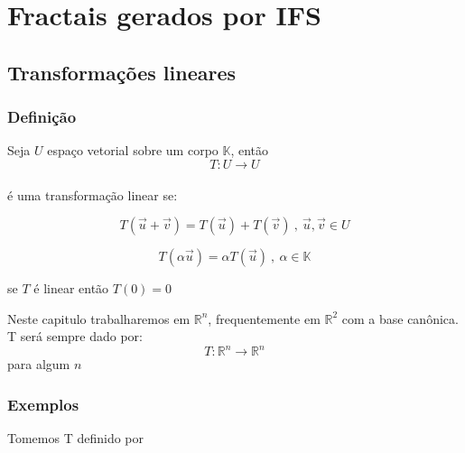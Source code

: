 \chapter{Fractais gerados por IFS}
\section{Transformações lineares}
\subsection{Definição}

Seja \(U\) espaço vetorial sobre um corpo \( \mathbb{K} \), então
\[T:U \longrightarrow U\]
\\
é uma transformação linear se:

\begin{equation}
    T(\Vec{u} + \Vec{v}) = T(\Vec{u}) + T(\Vec{v})\ , \ \Vec{u}, \Vec{v} \in U
\end{equation}

\begin{equation}
    T(\alpha\Vec{u}) = \alpha T(\Vec{u}) \ , \ \alpha \in \mathbb{K}
\end{equation}

\begin{theorem}
se \(T\) é linear então \( T(0) = 0 \)
\end{theorem}

\begin{remark}
Neste capitulo trabalharemos em \( \mathbb{R}^{n} \), frequentemente em \( \mathbb{R}^{2} \) com a base canônica. T será sempre dado por:
\[ T: \mathbb{R}^n \longrightarrow \mathbb{R}^n \]
para algum \(n\)
\end{remark}

\subsection{Exemplos}

Tomemos T definido por

